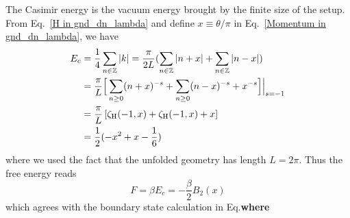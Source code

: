The Casimir energy is the vacuum energy brought by the finite size of the setup. From Eq.~\eqref{H in gnd_dn_lambda} and define $x\equiv\theta/\pi$ in Eq.~\eqref{Momentum in gnd_dn_lambda}, we have
\begin{equation}
\begin{aligned}
E_c &= \frac{1}{4} \sum_{n \in \mathbb{Z}} | k| = \frac{\pi}{2L} ( \sum_{n \in \mathbb{Z}}  | n + x | + \sum_{n \in \mathbb{Z}}  | n - x |  ) \\  
&= \frac{\pi}{L} \Big[\sum_{n \ge 0 } ( n + x )^{-s} + \sum_{n \ge 0 }  ( n - x)^{-s}  +   x^{-s} \Big]\Big|_{s = -1} \\
&= \frac{\pi}{L} \left[ \zeta_{\rm H}( -1, x ) + \zeta_{\rm H}( -1, x ) +  x \right] \\
&= \frac{1}{2} ( - x^2 + x - \frac{1}{6})
\end{aligned}
\end{equation}
where we used the fact that the unfolded geometry has length $L=2\pi$. Thus the free energy reads
\begin{equation}
F = \beta E_c = - \frac{\beta}{2} B_2( x) 
\end{equation}
which agrees with the boundary state calculation in Eq.{\bf\color{red}where}


